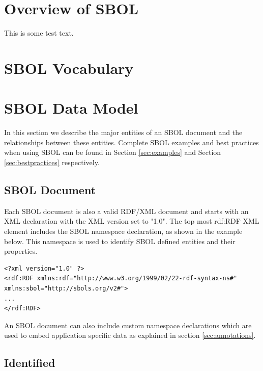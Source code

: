 \documentclass[draftspec]{sbmlpkgspec}
\newcommand{\lstsetsbol}{
 \lstset{language=sbol,
        tabsize=2
 }
}
\begin{document}
\section{Overview of SBOL}
This is some test text. 

\section{SBOL Vocabulary}

\section{SBOL Data Model}
In this section we describe the major entities of an SBOL document and the relationships between these entities. Complete SBOL examples and best practices when using SBOL can be found in Section \ref{sec:examples} and Section \ref{sec:bestpractices} respectively. 



\subsection {SBOL Document}
Each SBOL document is also a valid RDF/XML document and starts with an XML declaration with the XML version set to "1.0". The top most rdf:RDF XML element includes the SBOL namespace declaration, as shown in the example below. This namespace is used to identify SBOL defined entities and their properties.

\lstsetsbol
\begin{lstlisting}
<?xml version="1.0" ?>
<rdf:RDF xmlns:rdf="http://www.w3.org/1999/02/22-rdf-syntax-ns#" xmlns:sbol="http://sbols.org/v2#">
...
</rdf:RDF>
\end{lstlisting}

An SBOL document can also include custom namespace declarations which are used to embed application specific data as explained in section \ref{sec:annotations}.




\subsection {Identified}
\label{sec:Identified}
\end{document}
